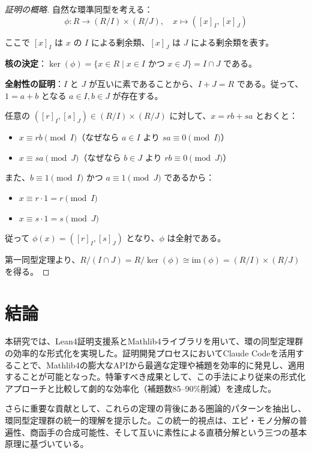 \documentclass[uplatex, a4paper]{jlreq}
\theoremstyle{definition}
\begin{document}
\begin{proof}[証明の概略]
自然な環準同型を考える：
\[
\phi: R \to (R/I) \times (R/J), \quad x \mapsto ([x]_I, [x]_J)
\]

ここで $[x]_I$ は $x$ の $I$ による剰余類、$[x]_J$ は $J$ による剰余類を表す。

\textbf{核の決定}：$\ker(\phi) = \{x \in R \mid x \in I \text{ かつ } x \in J\} = I \cap J$ である。

\textbf{全射性の証明}：$I$ と $J$ が互いに素であることから、$I + J = R$ である。従って、$1 = a + b$ となる $a \in I, b \in J$ が存在する。

任意の $([r]_I, [s]_J) \in (R/I) \times (R/J)$ に対して、$x = rb + sa$ とおくと：
\begin{itemize}
\item $x \equiv rb \pmod{I}$（なぜなら $a \in I$ より $sa \equiv 0 \pmod{I}$）
\item $x \equiv sa \pmod{J}$（なぜなら $b \in J$ より $rb \equiv 0 \pmod{J}$）
\end{itemize}

また、$b \equiv 1 \pmod{I}$ かつ $a \equiv 1 \pmod{J}$ であるから：
\begin{itemize}
\item $x \equiv r \cdot 1 = r \pmod{I}$
\item $x \equiv s \cdot 1 = s \pmod{J}$
\end{itemize}

従って $\phi(x) = ([r]_I, [s]_J)$ となり、$\phi$ は全射である。

第一同型定理より、$R/(I \cap J) = R/\ker(\phi) \cong \mathrm{im}(\phi) = (R/I) \times (R/J)$ を得る。
\end{proof}

\section{結論}

本研究では、Lean4証明支援系とMathlib4ライブラリを用いて、環の同型定理群の効率的な形式化を実現した。証明開発プロセスにおいてClaude Codeを活用することで、Mathlib4の膨大なAPIから最適な定理や補題を効率的に発見し、適用することが可能となった。特筆すべき成果として、この手法により従来の形式化アプローチと比較して劇的な効率化（補題数85--90\%削減）を達成した。

さらに重要な貢献として、これらの定理の背後にある圏論的パターンを抽出し、環同型定理群の統一的理解を提示した。この統一的視点は、エピ・モノ分解の普遍性、商函手の合成可能性、そして互いに素性による直積分解という三つの基本原理に基づいている。
\end{document}

